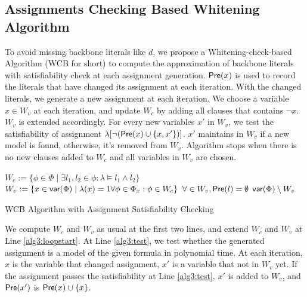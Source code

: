 \medskip

\subsection{Assignments Checking Based Whitening Algorithm}

To avoid missing backbone literals like $d$, we propose a Whitening-check-based Algorithm (WCB for short) to compute the approximation of backbone literals with satisfiability check at each assignment generation. $\textsf{Pre}(x)$ is used to record the literals that have changed its assignment at each iteration. With the changed literals, we generate a new assignment at each iteration. We choose a variable $x\in W_v$ at each iteration, and update $W_c$ by adding all clauses that contains $\neg x$. $W_v$ is extended accordingly. For every new variables $x'$ in $W_v$, we test the satisfiability of assignment $\lambda[\neg (\textsf{Pre}(x)\cup\{x,x'\})]$. $x'$ maintains in $W_v$ if a new model is found, otherwise, it's removed from $W_v$. Algorithm stops when there is no new clauses added to $W_c$ and all variables in $W_v$ are chosen.

\newpage

\begin{algorithm2e}
\SetAlgoShortEnd
\SetFillComment
{}
$W_c:=\{\phi\in\Phi\mid \exists l_1,l_2\in\phi: \lambda\models l_1\wedge l_2\}$\;\label{alg3:l1}
$W_v:=\{x\in\textsf{var}(\Phi) \mid \lambda(x)=1 \forall\phi\in\Phi_x: \phi\in W_c\}$\; \label{alg3:l2}
$\forall \in W_v, \textsf{Pre}(l)=\emptyset$\;
\label{alg3:loopend}
\Return $\textsf{var}(\Phi)\setminus W_v$\;
\caption{WCB Algorithm with Assignment Satisfiability Checking}
\label{alg:ewhite}
\end{algorithm2e}

We compute $W_c$ and $W_v$ as usual at the first two lines, and extend $W_c$ and $W_v$ at Line \ref{alg3:loopstart}. At Line \ref{alg3:test}, we test whether the generated assignment is a model of the given formula in polynomial time. At each iteration, $x$ is the variable that changed assignment, $x'$ is a variable that not in $W_v$ yet. If the assignment passes the satisfiability at Line \ref{alg3:test}, $x'$ is added to $W_v$, and $\textsf{Pre}(x')$ is $\textsf{Pre}(x)\cup \{x\}$.

